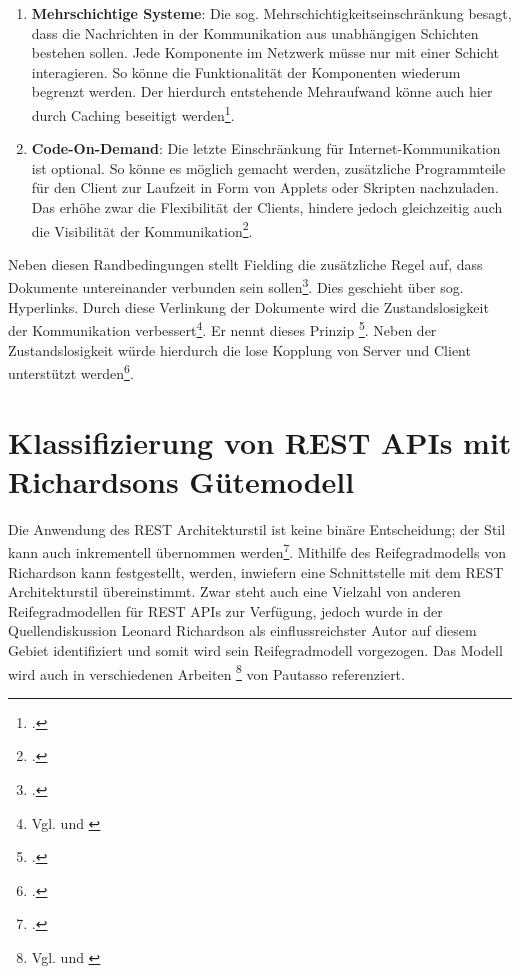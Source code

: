 \begin{enumerate}
    \item \textbf{Mehrschichtige Systeme}: Die sog. Mehrschichtigkeitseinschränkung besagt, dass die Nachrichten in der Kommunikation aus unabhängigen Schichten bestehen sollen. Jede Komponente im Netzwerk müsse nur mit einer Schicht interagieren. So könne die Funktionalität der Komponenten wiederum begrenzt werden. Der hierdurch entstehende Mehraufwand könne auch hier durch Caching beseitigt werden\footcite[Vgl. ][S. 82f]{fielding_architectural_2000}.
    \item \textbf{Code-On-Demand}: Die letzte Einschränkung für Internet-Kommunikation ist optional. So könne es möglich gemacht werden, zusätzliche Programmteile für den Client zur Laufzeit in Form von Applets oder Skripten nachzuladen. Das erhöhe zwar die Flexibilität der Clients, hindere jedoch gleichzeitig auch die Visibilität der Kommunikation\footcite[Vgl. ][S. 84f]{fielding_architectural_2000}.
\end{enumerate}

Neben diesen Randbedingungen stellt Fielding die zusätzliche Regel auf, dass Dokumente untereinander verbunden sein sollen\footcite[Vgl. ][S. 76]{fielding_architectural_2000}. Dies geschieht über sog. Hyperlinks. Durch diese Verlinkung der Dokumente wird die Zustandslosigkeit der Kommunikation verbessert\footnote{Vgl. \cite[S. 807]{pautasso_restful_2008} und \cite[S. 86]{franch_detection_2014}}. Er nennt dieses Prinzip \footcite[Vgl. ][S. 3]{pautasso_restful_2014}. Neben der Zustandslosigkeit würde hierdurch die lose Kopplung von Server und Client unterstützt werden\footcite[Vgl. ][S. 4]{tilkov_rest_2015}.

\section{Klassifizierung von REST APIs mit Richardsons Gütemodell}\label{section:klassifizierung-von-rest}

Die Anwendung des REST Architekturstil ist keine binäre Entscheidung; der Stil kann auch inkrementell übernommen werden\footcite[Vgl. ][S. 4]{pautasso_restful_2014}. Mithilfe des Reifegradmodells von Richardson kann festgestellt, werden, inwiefern eine Schnittstelle mit dem REST Architekturstil übereinstimmt. Zwar steht auch eine Vielzahl von anderen Reifegradmodellen für REST APIs zur Verfügung, jedoch wurde in der Quellendiskussion Leonard Richardson als einflussreichster Autor auf diesem Gebiet identifiziert und somit wird sein Reifegradmodell vorgezogen. Das Modell wird auch in verschiedenen Arbeiten \footnote{Vgl. \cite[S. 807]{pautasso_restful_2008} und \cite[S. 4]{pautasso_restful_2014}} von Pautasso referenziert.

